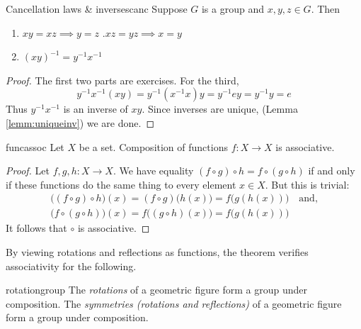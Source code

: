 \goodbreak

\begin{thm}{Cancellation laws \& inverses}{canc}
Suppose $G$ is a group and $x,y,z\in G$. Then
\begin{enumerate}\itemsep2pt
  \item $xy=xz\implies y=z$ \qquad{}.\lstsp $xz=yz\implies x=y$\setcounter{enumi}{2}
  \item $(xy)^{-1}=y^{-1}x^{-1}$
\end{enumerate}
\end{thm}

\begin{proof}
The first two parts are exercises. For the third,
\[y^{-1}x^{-1}(xy)=y^{-1}(x^{-1}x)y=y^{-1}ey=y^{-1}y=e\]
Thus $y^{-1}x^{-1}$ is an inverse of $xy$. Since inverses are unique, (Lemma \ref{lemm:uniqueinv}) we are done.
\end{proof}


\label{sec:assoc}


\begin{thm}{}{funcassoc}
Let $X$ be a set. Composition of functions $f:X\to X$ is associative.%
\end{thm}

\begin{proof}
Let $f,g,h:X\to X$. We have equality $(f\circ g)\circ h=f\circ(g\circ h)$ if and only if these functions do the same thing to every element $x\in X$. But this is trivial:
\begin{gather*}
\bigl((f\circ g)\circ h\bigr)(x)=(f\circ g)\bigl(h(x)\bigr)=f\bigl(g(h(x))\bigr)\quad\text{and,}\\
\bigl(f\circ(g\circ h)\bigr)(x)=f\bigl((g\circ h)(x)\bigr)=f\bigl(g(h(x))\bigr)
\end{gather*}
It follows that $\circ$ is associative. %
\end{proof}

By viewing rotations and reflections as functions, the theorem verifies associativity for the following.

\begin{cor}{}{rotationgroup}
The \emph{rotations} of a geometric figure form a group under composition.\smallbreak
The \emph{symmetries (rotations and reflections)} of a geometric figure form a group under composition.
\end{cor}

